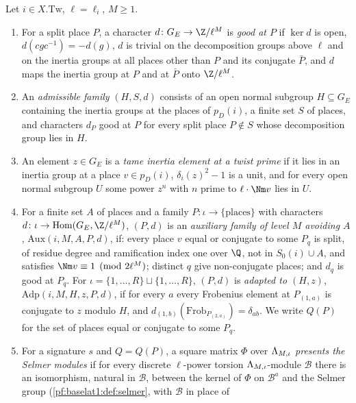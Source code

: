 \begin{definition}\label{pf:baselat1:def:aux}
Let $i\in X.\mathrm{Tw}$, $\ell=\ell_i$, $M\ge1$.
\begin{enumerate}[label=(\alph*)]
\item For a split place $P$, a character $d\colon G_E\to\Z/\ell^M$ is \emph{good at $P$} if
  $\ker d$ is open, $d(cgc^{-1})=-d(g)$, $d$ is trivial on the decomposition groups above $\ell$ and on the
  inertia groups at all places other than $P$ and its conjugate $\bar P$, and $d$ maps the inertia group at $P$
  and at $\bar P$ onto $\Z/\ell^M$.
\item An \emph{admissible family} $(H,S,d)$ consists of an open normal subgroup $H\subseteq G_E$
  containing the inertia groups at the places of $p_D(i)$, a finite set $S$ of places, and characters $d_P$ good at
  $P$ for every split place $P\notin S$ whose decomposition group lies in $H$.
\item An element $z\in G_E$ is a \emph{tame inertia element at a twist prime} if it lies in an inertia group at
  a place $v\in p_D(i)$,
  $\delta_i(z)^2-1$ is a unit, and for every open normal subgroup $U$ some power $z^n$ with $n$ prime to
  $\ell\cdot\Nm v$ lies in $U$.
\item For a finite set $A$ of places and a family $P\colon\iota\to\{\text{places}\}$ with characters
  $d\colon\iota\to\mathrm{Hom}(G_E,\Z/\ell^M)$, $(P,d)$ is an \emph{auxiliary family of level $M$ avoiding $A$},
  $\mathrm{Aux}(i,M,A,P,d)$, if: every place $v$ equal or
  conjugate to some $P_q$ is split, of residue degree and ramification index one over $\Q$, not in $S_0(i)\cup A$,
  and satisfies $\Nm v\equiv1\pmod{2\ell^M}$; distinct $q$ give non-conjugate places; and $d_q$ is good at $P_q$.
  For $\iota=\{1,\dots,R\}\sqcup\{1,\dots,R\}$, $(P,d)$ is \emph{adapted to $(H,z)$}, $\mathrm{Adp}(i,M,H,z,P,d)$,
  if for every $a$ every Frobenius
  element at $P_{(1,a)}$ is conjugate to $z$ modulo $H$, and $d_{(1,b)}(\mathrm{Frob}_{P_{(2,a)}})=\delta_{ab}$.
  We write $Q(P)$ for the set of places equal or conjugate to some $P_q$.
\item For a signature $s$ and $Q=Q(P)$, a square matrix $\Phi$ over $\Lambda_{M,\iota}$
  \emph{presents the Selmer modules} if for every discrete $\ell$-power torsion
  $\Lambda_{M,\iota}$-module $\mathcal B$ there is an isomorphism, natural in $\mathcal B$, between the kernel of
  $\Phi$ on $\mathcal B^a$ and the Selmer group (\cref{pf:baselat1:def:selmer}, with $\mathcal B$ in place of

\end{enumerate}
\end{definition}
